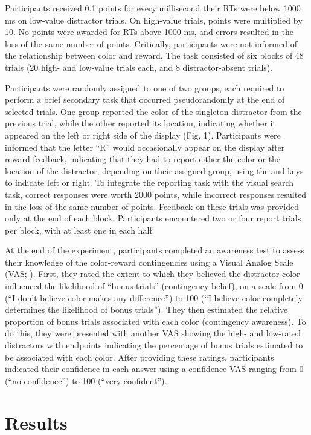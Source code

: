 \documentclass[
  man,
  floatsintext,
  longtable,
  nolmodern,
  notxfonts,
  notimes,
  colorlinks=true,linkcolor=blue,citecolor=blue,urlcolor=blue]{apa7}
\begin{document}
Participants received 0.1 points for every millisecond their RTs were
below 1000 ms on low-value distractor trials. On high-value trials,
points were multiplied by 10. No points were awarded for RTs above 1000
ms, and errors resulted in the loss of the same number of points.
Critically, participants were not informed of the relationship between
color and reward. The task consisted of six blocks of 48 trials (20
high- and low-value trials each, and 8 distractor-absent trials).

Participants were randomly assigned to one of two groups, each required
to perform a brief secondary task that occurred pseudorandomly at the
end of selected trials. One group reported the color of the singleton
distractor from the previous trial, while the other reported its
location, indicating whether it appeared on the left or right side of
the display (Fig. 1). Participants were informed that the letter ``R''
would occasionally appear on the display after reward feedback,
indicating that they had to report either the color or the location of
the distractor, depending on their assigned group, using the and keys to
indicate left or right. To integrate the reporting task with the visual
search task, correct responses were worth 2000 points, while incorrect
responses resulted in the loss of the same number of points. Feedback on
these trials was provided only at the end of each block. Participants
encountered two or four report trials per block, with at least one in
each half.

At the end of the experiment, participants completed an awareness test
to assess their knowledge of the color-reward contingencies using a
Visual Analog Scale (VAS; ). First, they rated the extent to which they believed the
distractor color influenced the likelihood of ``bonus trials''
(contingency belief), on a scale from 0 (``I don't believe color makes
any difference'') to 100 (``I believe color completely determines the
likelihood of bonus trials''). They then estimated the relative
proportion of bonus trials associated with each color (contingency
awareness). To do this, they were presented with another VAS showing the
high- and low-rated distractors with endpoints indicating the percentage
of bonus trials estimated to be associated with each color. After
providing these ratings, participants indicated their confidence in each
answer using a confidence VAS ranging from 0 (``no confidence'') to 100
(``very confident'').

\section{Results}\label{results}
\end{document}

